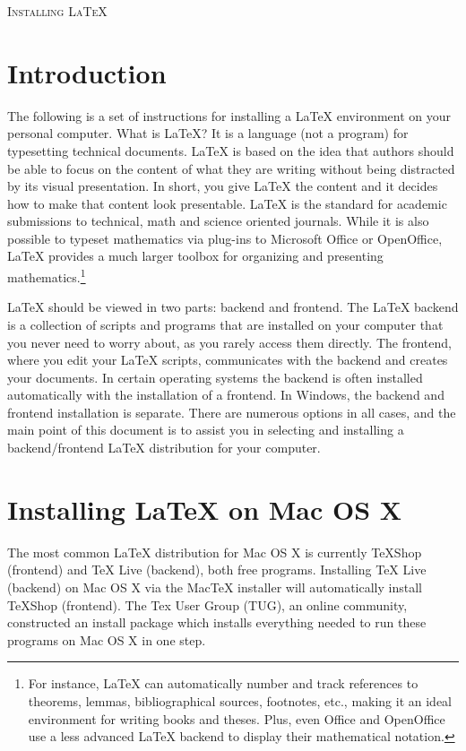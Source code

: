 \documentclass{article}
\begin{document}
\begin{center}
	\textsc{\Large Installing \LaTeX}
\end{center}


\tableofcontents


\section{Introduction}

The following is a set of instructions for installing a LaTeX environment on your personal computer. What is LaTeX? It is a language (not a program) for typesetting technical documents. LaTeX is based on the idea that authors should be able to focus on the content of what they are writing without being distracted by its visual presentation. In short, you give LaTeX the content and it decides how to make that content look presentable. LaTeX is the standard for academic submissions to technical, math and science oriented journals. While it is also possible to typeset mathematics via plug-ins to Microsoft Office or OpenOffice, LaTeX provides a much larger toolbox for organizing and presenting mathematics.\footnote{For instance, LaTeX can automatically number and track references to theorems, lemmas, bibliographical sources, footnotes, etc., making it an ideal environment for writing books and theses. Plus, even Office and OpenOffice use a less advanced LaTeX backend to display their mathematical notation.}

\bigbreak
LaTeX should be viewed in two parts: backend and frontend. The LaTeX backend is a collection of scripts and programs that are installed on your computer that you never need to worry about, as you rarely access them directly. The frontend, where you edit your LaTeX scripts, communicates with the backend and creates your documents. In certain operating systems the backend is often installed automatically with the installation of a frontend. In Windows, the backend and frontend installation is separate. There are numerous options in all cases, and the main point of this document is to assist you in selecting and installing a backend/frontend LaTeX distribution for your computer.


\section{Installing LaTeX on Mac OS X}

The most common LaTeX distribution for Mac OS X is currently TeXShop (frontend) and TeX Live (backend), both free programs. Installing TeX Live (backend) on Mac OS X via the MacTeX installer will automatically install TeXShop (frontend). The Tex User Group (TUG), an online community, constructed an install package which installs everything needed to run these programs on Mac OS X in one step.
\end{document}
